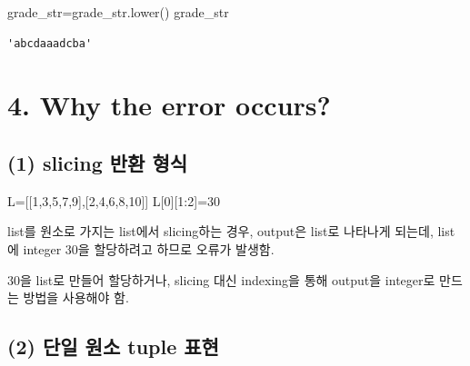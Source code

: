 \documentclass[
  a4paper,
  DIV=11,
  numbers=noendperiod]{scrreprt}
\newenvironment{Shaded}{\begin{snugshade}}{\end{snugshade}}
\newcommand{\DecValTok}[1]{\textcolor[rgb]{0.68,0.00,0.00}{#1}}
\newcommand{\NormalTok}[1]{\textcolor[rgb]{0.00,0.23,0.31}{#1}}
\newcommand{\OperatorTok}[1]{\textcolor[rgb]{0.37,0.37,0.37}{#1}}
\begin{document}
\begin{Shaded}
\begin{Highlighting}[]
\NormalTok{grade\_str}\OperatorTok{=}\NormalTok{grade\_str.lower()}
\NormalTok{grade\_str}
\end{Highlighting}
\end{Shaded}

\begin{verbatim}
'abcdaaadcba'
\end{verbatim}

\section*{4. Why the error occurs?}\label{why-the-error-occurs-1}


\subsection*{(1) slicing 반환
형식}\label{slicing-uxbc18uxd658-uxd615uxc2dd}

\begin{Shaded}
\begin{Highlighting}[]
\NormalTok{L}\OperatorTok{=}\NormalTok{[[}\DecValTok{1}\NormalTok{,}\DecValTok{3}\NormalTok{,}\DecValTok{5}\NormalTok{,}\DecValTok{7}\NormalTok{,}\DecValTok{9}\NormalTok{],[}\DecValTok{2}\NormalTok{,}\DecValTok{4}\NormalTok{,}\DecValTok{6}\NormalTok{,}\DecValTok{8}\NormalTok{,}\DecValTok{10}\NormalTok{]]}
\NormalTok{L[}\DecValTok{0}\NormalTok{][}\DecValTok{1}\NormalTok{:}\DecValTok{2}\NormalTok{]}\OperatorTok{=}\DecValTok{30}
\end{Highlighting}
\end{Shaded}

list를 원소로 가지는 list에서 slicing하는 경우, output은 list로 나타나게
되는데, list에 integer 30을 할당하려고 하므로 오류가 발생함.

30을 list로 만들어 할당하거나, slicing 대신 indexing을 통해 output을
integer로 만드는 방법을 사용해야 함.

\subsection*{(2) 단일 원소 tuple
표현}\label{uxb2e8uxc77c-uxc6d0uxc18c-tuple-uxd45cuxd604}
\end{document}
